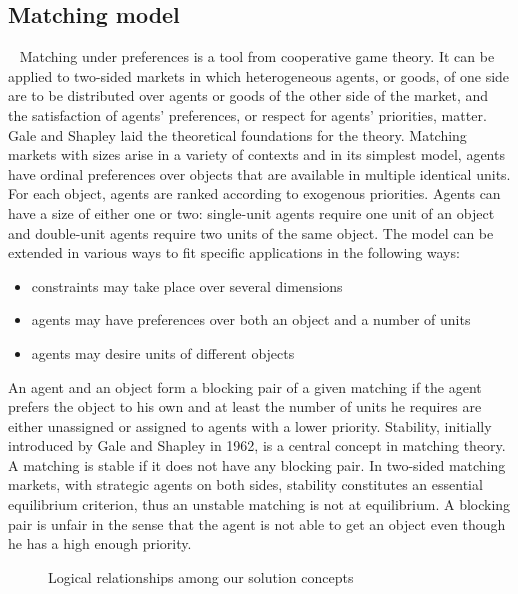 \documentclass[letterpaper]{article} %
\begin{document}
    \subsection{Matching model}\label{matching-model}%
    ~\citet{olbergml,basshuysen,delacretaz_2020}
Matching under preferences is a tool from cooperative game theory. It can be applied to two-sided
markets in which heterogeneous agents, or goods, of one side are to be distributed over agents or
goods of the other side of the market, and the satisfaction of agents’ preferences, or respect for agents’
priorities, matter. Gale and Shapley laid the theoretical foundations for the theory.
Matching markets with sizes arise in a variety of contexts and in its simplest model, agents have ordinal preferences over objects that are available in multiple identical units. For each object, agents
are ranked according to exogenous priorities. Agents can have a size of either one or two:
single-unit agents require one unit of an object and double-unit agents require two units of the
same object. The model can be extended in various ways to fit specific applications in the following ways:
\begin{itemize}
\item constraints may take place over several dimensions
\item agents may have preferences over both an object and a number of
units
\item agents may desire units of different objects
\end{itemize}
 An agent and an object form a blocking pair of a
given matching if the agent prefers the object to his own and at least the number of units he requires are either unassigned or assigned to agents with a lower priority.
Stability, initially introduced by Gale and Shapley in 1962, is a central concept in matching theory. A matching
is stable if it does not have any blocking pair. In two-sided matching markets, with
strategic agents on both sides, stability constitutes an essential equilibrium criterion, thus an unstable matching is not at equilibrium. A blocking pair
is unfair in the sense that the agent is not able to get an object even though he has a high enough priority. 
    \begin{figure}[!htb]
        \def\svgwidth{\columnwidth}
        
        \caption{Logical relationships among our solution concepts}
        \label{fig:matching}
    \end{figure}
\end{document}
